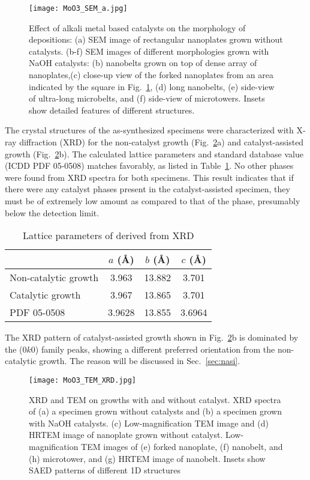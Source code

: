 \begin{figure}[htb]
\centering
\texttt{[image: MoO3\_SEM\_a.jpg]}
\caption[Effect of alkali metal based catalysts on the morphology of  depositions]{Effect of alkali metal based catalysts on the morphology of  depositions: (a) SEM image of rectangular nanoplates grown without catalysts. (b-f) SEM images of different morphologies grown with NaOH catalysts: (b) nanobelts grown on top of dense array of nanoplates,(c) close-up view of the forked nanoplates from an area indicated by the square in Fig.~\ref{fig:ch4sem2by3}, (d) long nanobelts, (e) side-view of ultra-long microbelts, and (f) side-view of microtowers. Insets show detailed features of different  structures.}
\label{fig:ch4sem2by3}
\end{figure}

The crystal structures of the as-synthesized specimens were characterized with X-ray diffraction (XRD) for the non-catalyst growth (Fig.~\ref{fig:ch4tem3by3}a) and catalyst-assisted growth (Fig.~\ref{fig:ch4tem3by3}b). The calculated lattice parameters and standard database value (ICDD PDF 05-0508) matches favorably, as listed in Table~\ref{tab:ch4xrd}. No other phases were found from XRD spectra for both specimens. This result indicates that if there were any catalyst phases present in the catalyst-assisted specimen, they must be of extremely low amount as compared to that of the  phase, presumably below the detection limit. 
\begin{table}[htb]
\centering
\caption{Lattice parameters of  derived from XRD}\label{tab:ch4xrd}
\begin{tabular}{lccc}
\toprule
           & $a$ (\AA) & $b$ (\AA) & $c$ (\AA)   \\
\midrule
Non-catalytic growth  & 3.963    & 13.882 & 3.701  \\
Catalytic growth  & 3.967    & 13.865 & 3.701  \\
PDF 05-0508       & 3.9628    & 13.855 & 3.6964  \\
\bottomrule
\end{tabular}
\end{table}

The XRD pattern of catalyst-assisted growth shown in Fig.~\ref{fig:ch4tem3by3}b is dominated by the (0$k$0) family peaks, showing a different preferred orientation from the non-catalytic growth. The reason will be discussed in Sec.~\ref{sec:nasi}. 

\begin{figure}[htb]
\centering
\texttt{[image: MoO3\_TEM\_XRD.jpg]}
\caption[XRD and TEM on  growths with and without catalyst]{XRD and TEM on  growths with and without catalyst. XRD spectra of (a) a specimen grown without catalysts and (b) a specimen grown with NaOH catalysts. (c) Low-magnification TEM image and (d) HRTEM image of nanoplate grown without catalyst. Low-magnification TEM images of (e) forked nanoplate, (f) nanobelt, and (h) microtower, and (g) HRTEM image of nanobelt. Insets show SAED patterns of different  1D structures}
\label{fig:ch4tem3by3}
\end{figure}

